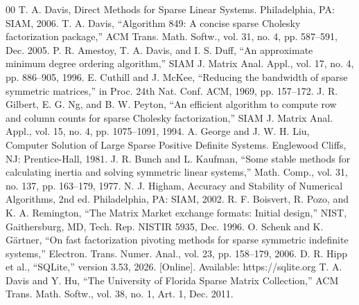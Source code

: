 \documentclass[conference]{IEEEtran}
\begin{document}
\begin{thebibliography}{00}
 T. A. Davis, Direct Methods for Sparse Linear Systems. Philadelphia, PA: SIAM, 2006.
 T. A. Davis, ``Algorithm 849: A concise sparse Cholesky factorization package,'' ACM Trans. Math. Softw., vol. 31, no. 4, pp. 587--591, Dec. 2005.
 P. R. Amestoy, T. A. Davis, and I. S. Duff, ``An approximate minimum degree ordering algorithm,'' SIAM J. Matrix Anal. Appl., vol. 17, no. 4, pp. 886--905, 1996.
 E. Cuthill and J. McKee, ``Reducing the bandwidth of sparse symmetric matrices,'' in Proc. 24th Nat. Conf. ACM, 1969, pp. 157--172.
 J. R. Gilbert, E. G. Ng, and B. W. Peyton, ``An efficient algorithm to compute row and column counts for sparse Cholesky factorization,'' SIAM J. Matrix Anal. Appl., vol. 15, no. 4, pp. 1075--1091, 1994.
 A. George and J. W. H. Liu, Computer Solution of Large Sparse Positive Definite Systems. Englewood Cliffs, NJ: Prentice-Hall, 1981.
 J. R. Bunch and L. Kaufman, ``Some stable methods for calculating inertia and solving symmetric linear systems,'' Math. Comp., vol. 31, no. 137, pp. 163--179, 1977.
 N. J. Higham, Accuracy and Stability of Numerical Algorithms, 2nd ed. Philadelphia, PA: SIAM, 2002.
 R. F. Boisvert, R. Pozo, and K. A. Remington, ``The Matrix Market exchange formats: Initial design,'' NIST, Gaithersburg, MD, Tech. Rep. NISTIR 5935, Dec. 1996.
 O. Schenk and K. G\"artner, ``On fast factorization pivoting methods for sparse symmetric indefinite systems,'' Electron. Trans. Numer. Anal., vol. 23, pp. 158--179, 2006.
 D. R. Hipp et al., ``SQLite,'' version 3.53, 2026. [Online]. Available: https://sqlite.org
 T. A. Davis and Y. Hu, ``The University of Florida Sparse Matrix Collection,'' ACM Trans. Math. Softw., vol. 38, no. 1, Art. 1, Dec. 2011.
\end{thebibliography}
\vspace{12pt}
\end{document}
